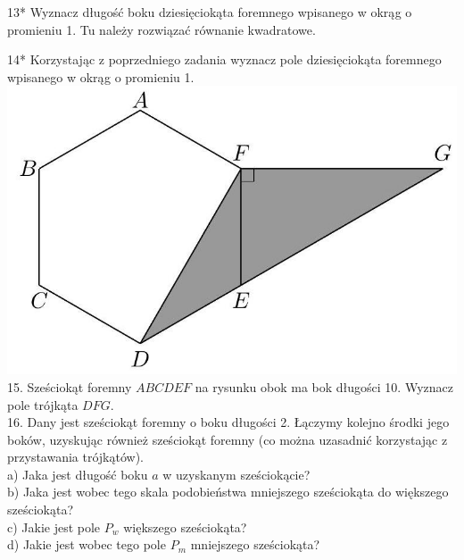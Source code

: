 \documentclass[10pt]{article}
\begin{document}
13* Wyznacz długość boku dziesięciokąta foremnego wpisanego w okrąg o promieniu 1. Tu należy rozwiązać równanie kwadratowe.

14* Korzystając z poprzedniego zadania wyznacz pole dziesięciokąta foremnego wpisanego w okrąg o promieniu 1.\\
\includegraphics[max width=\textwidth, center]{2024_11_21_e9b4faa005d5be2cc318g-057}\\
15. Sześciokąt foremny \(A B C D E F\) na rysunku obok ma bok długości 10. Wyznacz pole trójkąta \(D F G\).\\
16. Dany jest sześciokąt foremny o boku długości 2. Łączymy kolejno środki jego boków, uzyskując również sześciokąt foremny (co można uzasadnić korzystając z przystawania trójkątów).\\
a) Jaka jest długość boku \(a\) w uzyskanym sześciokącie?\\
b) Jaka jest wobec tego skala podobieństwa mniejszego sześciokąta do większego sześciokąta?\\
c) Jakie jest pole \(P_{w}\) większego sześciokąta?\\
d) Jakie jest wobec tego pole \(P_{m}\) mniejszego sześciokąta?\\
\end{document}
